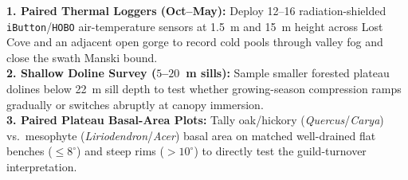 \begin{readerbox}
\small
\textbf{1. Paired Thermal Loggers (Oct--May):} Deploy 12--16 radiation-shielded \texttt{iButton}/\texttt{HOBO} air-temperature sensors at 1.5~m and 15~m height across Lost Cove and an adjacent open gorge to record cold pools through valley fog and close the swath Manski bound.\\
\textbf{2. Shallow Doline Survey ($5$--$20$~m sills):} Sample smaller forested plateau dolines below 22~m sill depth to test whether growing-season compression ramps gradually or switches abruptly at canopy immersion.\\
\textbf{3. Paired Plateau Basal-Area Plots:} Tally oak/hickory (\emph{Quercus}/\emph{Carya}) vs.\ mesophyte (\emph{Liriodendron}/\emph{Acer}) basal area on matched well-drained flat benches ($\le 8^\circ$) and steep rims ($>10^\circ$) to directly test the guild-turnover interpretation.
\end{readerbox}

